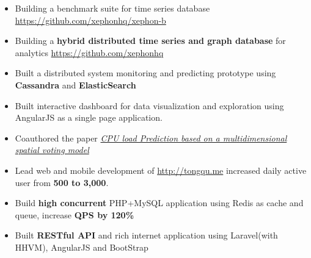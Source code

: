 \documentclass[10pt, letterpaper]{simple-cv}
\begin{document}
\begin{itemize}
\item Building a benchmark suite for time series database \url{https://github.com/xephonhq/xephon-b}
\item Building a \textbf{hybrid distributed time series and graph database} for analytics \url{https://github.com/xephonhq}
\end{itemize}

\begin{itemize}
\item Built a distributed system monitoring and predicting prototype using \textbf{Cassandra} and \textbf{ElasticSearch}
\item Built interactive dashboard for data visualization and exploration using AngularJS as a single page application.
\item Coauthored the paper \textit{\href{https://at15.github.io/pub/cpu_load_prediction.pdf}{CPU load Prediction based on a multidimensional spatial voting model}}
\end{itemize}

\begin{itemize}
\item Lead web and mobile development of \url{http://tongqu.me} increased daily active user from \textbf{500 to 3,000}.
\item Build \textbf{high concurrent} PHP+MySQL application using Redis as cache and queue, increase \textbf{QPS by 120\%}
\item Built \textbf{RESTful API} and rich internet application using Laravel(with HHVM), AngularJS and BootStrap
\end{itemize}
\end{document}
